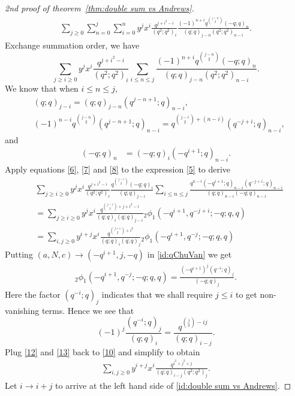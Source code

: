 \documentclass[11pt,reqno]{amsart}
\numberwithin{equation}{section}
\theoremstyle{plain}
\theoremstyle{definition}
\theoremstyle{named}
\begin{document}
\begin{proof}[2nd proof of theorem~\ref{thm:double sum vs Andrews}]
\begin{align*}
\sum_{j\geq 0}\sum_{n=0}^{j}\sum_{i=0}^{n}y^{j}x^{i}\frac{q^{j+i^2-i}}{(q^2; q^2)_{i}}\frac{(-1)^{n+i}q^{\binom{j-n}{2}}(-q; q)_{n}}{(q; q)_{j-n}(q^2; q^2)_{n-i}}.
\end{align*}
Exchange summation order, we have
\begin{equation}
\sum_{j\ge i\ge 0}y^{j}x^{i}\frac{q^{j+i^2-i}}{(q^2; q^2)_{i}}\sum_{i\le n\le j}\frac{(-1)^{n+i}q^{\binom{j-n}{2}}(-q; q)_{n}}{(q; q)_{j-n}(q^2; q^2)_{n-i}}.\label{5}
\end{equation}
We know that when $i\le n\le j$,
\begin{align}
& (q; q)_{j-i}=(q; q)_{j-n}(q^{j-n+1}; q)_{n-i},\label{6}\\
& (-1)^{n-i}q^{\binom{j-n}{2}}(q^{j-n+1}; q)_{n-i}=q^{\binom{j-i}{2}+(n-i)}(q^{-j+i}; q)_{n-i},\label{7}
\end{align}
and
\begin{align}
(-q; q)_{n} &=(-q; q)_{i}(-q^{i+1}; q)_{n-i}.\label{8}
\end{align}
Apply equations \eqref{6}, \eqref{7} and \eqref{8} to the expression \eqref{5} to derive
\begin{align}
&\sum_{j\ge i\ge 0}y^{j}x^{i}\frac{q^{j+i^2-i}}{(q^2; q^2)_{i}}\frac{q^{\binom{j-i}{2}}(-q; q)_{i}}{(q; q)_{j-i}}\sum_{i\le n\le j}\frac{q^{n-i}(-q^{i+1}; q)_{n-i}(q^{-j+i}; q)_{n-i}}{(q; q)_{n-i}(-q; q)_{n-i}}\nonumber\\
&=\sum_{j\ge i\ge 0}y^jx^i\frac{q^{\binom{j-i}{2}+j+i^2-i}}{(q; q)_{i}(q; q)_{j-i}} {}_{2}\phi_{1}(-q^{i+1}, q^{-j+i}; -q; q, q)\nonumber\\
&=\sum_{i,j \ge 0}y^{i+j}x^i\frac{q^{\binom{j+1}{2}+i^2}}{(q; q)_{i}(q; q)_{j}} {}_{2}\phi_{1}(-q^{i+1}, q^{-j}; -q; q, q) \label{10}
\end{align}
Putting $(a, N, c)\to (-q^{i+1}, j, -q)$ in \eqref{id:qChuVan} we get 
\begin{align}\label{12}
_{2}\phi_{1}(-q^{i+1}, q^{-j}; -q; q, q)=\frac{(-q^{i+1})^{j}(q^{-i}; q)_{j}}{(-q; q)_{j}}.
\end{align}
Here the factor $(q^{-i};q)_j$ indicates that we shall require $j\le i$ to get non-vanishing terms. Hence we see that
\begin{equation}
(-1)^{j}\frac{(q^{-i}; q)_{j}}{(q; q)_{i}}=\frac{q^{\binom{j}{2}-ij}}{(q; q)_{i-j}}.\label{13}
\end{equation}
Plug \eqref{12} and \eqref{13} back to \eqref{10} and simplify to obtain
\begin{align*}
\sum_{i, j\geq 0}y^{i+j}x^{i}\frac{q^{i^2+j^2+j}}{(q; q)_{i-j}(q^2; q^2)_{j}}.
\end{align*}
Let $i\to i+j$ to arrive at the left hand side of \eqref{id:double sum vs Andrews}.
\end{proof}
\end{document}

